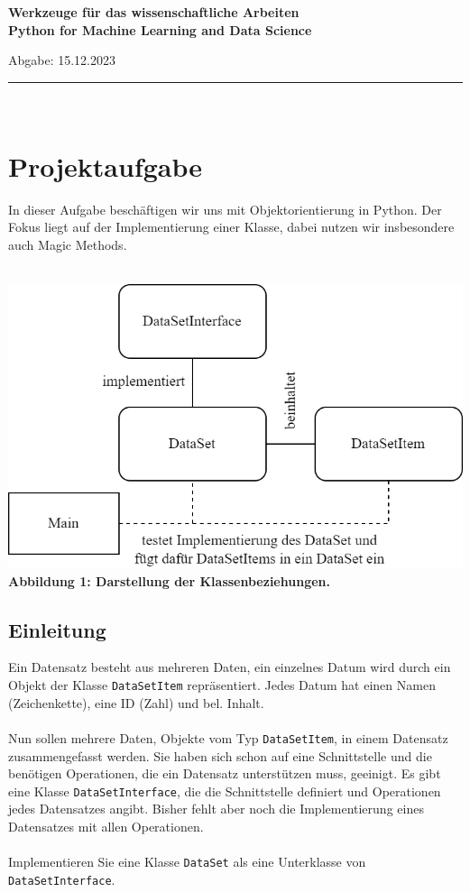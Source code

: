 \documentclass[a4paper]{article}
\begin{document}
\bf
\Large\noindent  Werkzeuge für das wissenschaftliche Arbeiten\\
\normalsize Python for Machine Learning and Data Science\\
\normalfont
\begin{center}
    \normalfont Abgabe: 15.12.2023\\
\end{center}
\hrule\hfill\\[0.2cm]

\tableofcontents

\section{Projektaufgabe}
In dieser Aufgabe beschäftigen wir uns mit Objektorientierung in Python.
Der Fokus liegt auf der Implementierung einer Klasse, dabei nutzen wir insbesondere auch Magic Methods.\\
\\
\begin{center}
    \includegraphics{./../diagram/classes_files.png}\\
    \scriptsize\bf Abbildung 1: \normalfont Darstellung der Klassenbeziehungen.\normalsize\\
\end{center}

\subsection{Einleitung}
Ein Datensatz besteht aus mehreren Daten, ein einzelnes Datum wird durch ein Objekt der Klasse \verb|DataSetItem| repräsentiert.
Jedes Datum hat einen Namen (Zeichenkette), eine ID (Zahl) und bel. Inhalt.\\
\\
Nun sollen mehrere Daten, Objekte vom Typ \verb|DataSetItem|, in einem Datensatz zusammengefasst werden.
Sie haben sich schon auf eine Schnittstelle und die benötigen Operationen, die ein Datensatz unterstützen muss, geeinigt.
Es gibt eine Klasse \verb|DataSetInterface|, die die Schnittstelle definiert und Operationen jedes Datensatzes angibt.
Bisher fehlt aber noch die Implementierung eines Datensatzes mit allen Operationen.\\
\\
Implementieren Sie eine Klasse \verb|DataSet| als eine Unterklasse von  \verb|DataSetInterface|.\\
\\
\end{document}
